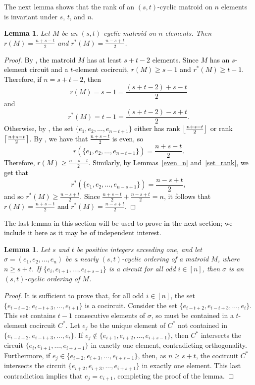 \documentclass[11pt]{amsart}
\newtheorem{lemma}[theorem]{Lemma}
\newcommand{\blue}{\textcolor{black}}
\newcommand{\bloo}{\textcolor{black}}
\DeclarePairedDelimiter\ceil{\lceil}{\rceil}
\DeclarePairedDelimiter\floor{\lfloor}{\rfloor}
\begin{document}
The next lemma shows that the rank of an $(s, t)$-cyclic matroid on $n$ elements is invariant under $s$, $t$, and $n$.

\begin{lemma}
\label{mat_rank}
Let $M$ be an $(s, t)$-cyclic matroid on $n$ elements. Then $\left.r(M) = \frac{n+s-t}{2}\right.$ and $r^*(M) = \frac{n-s+t}{2}$.
\end{lemma}

\begin{proof}
\bloo{By , the matroid $M$ has at least $s+t-2$ elements. Since $M$ has an $s$-element circuit and a $t$-element cocircuit, $r(M) \geq s-1$ and $r^*(M) \geq t-1$. Therefore, if $n=s+t-2$, then}
$$r(M) = s-1 = {\textstyle \frac{(s+t-2) + s-t}{2}}$$
and
$$r^*(M) = t-1 = {\textstyle \frac{(s+t-2)-s+t}{2}}.$$
\bloo{Otherwise, by , the set $\{e_1,e_2,\ldots,e_{n-t+1}\}$ either has rank $\floor*{\frac{n+s-t}{2}}$ or rank $\ceil*{\frac{n+s-t}{2}}$. By , we have that $\frac{n+s-t}{2}$ is even, so
\[
r(\{e_1,e_2,\ldots,e_{n-t+1}\}) = \frac{n+s-t}{2}.
\]
Therefore, $r(M) \geq \frac{n+s-t}{2}$. Similarly, by Lemmas~\ref{even_n} and~\ref{set_rank}, we get that
\[
r^*(\{e_1,e_2,\ldots,e_{n-s+1}\}) = \frac{n-s+t}{2},
\]
and so $r^*(M) \geq \frac{n-s+t}{2}$. Since $\frac{n+s-t}{2} + \frac{n-s+t}{2} = n$, it follows that $\left.r(M) = \frac{n+s-t}{2}\right.$ and $r^*(M) = \frac{n-s+t}{2}$.}
\end{proof}

The last lemma in this section \blue{will be used to prove  in the next section; we include it here as it may be of independent interest.}

\begin{lemma}
\label{total_circuits}
Let $s$ and $t$ be positive integers exceeding one, and let $\sigma = (e_1, e_2, \ldots, e_n)$ be a nearly $(s, t)$-cyclic ordering of a matroid $M$, where $n \geq s+t$. If $\{e_i, e_{i+1}, \ldots, e_{i+s-1}\}$ is a circuit for all odd $i \in [n]$, then $\sigma$ is an $(s, t)$-cyclic ordering of $M$.
\end{lemma}

\begin{proof}
It is sufficient to prove that, for all odd $i \in [n]$, the set $\{e_{i-t+2}, e_{i-t+3}, \ldots, e_{i+1}\}$ is a cocircuit. Consider the set $\{e_{i-t+2}, e_{i-t+3}, \ldots, e_i\}$. This set contains $t-1$ consecutive elements of $\sigma$, so must be contained in a $t$-element cocircuit $C^*$. Let $e_j$ be the unique element of $C^*$ not contained in $\{e_{i-t+2}, e_{i-t+3}, \ldots, e_i\}$. If $e_j \notin \{e_{i+1}, e_{i+2}, \ldots, e_{i+s-1}\}$, then $C^*$ intersects the circuit $\{e_i, e_{i+1}, \ldots, e_{i+s-1}\}$ in exactly one element, contradicting orthogonality. Furthermore, if $e_j \in \{e_{i+2}, e_{i+3}, \ldots, e_{i+s-1}\}$, then, as $n \geq s+t$, the cocircuit $C^*$ intersects the circuit $\{e_{i+2}, e_{i+3}, \ldots, e_{i+s+1}\}$ in exactly one element. This last contradiction implies that $e_j = e_{i+1}$, completing the proof of the lemma.
\end{proof}
\end{document}
